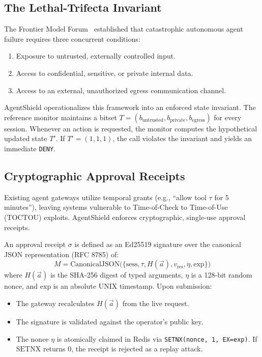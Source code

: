 \documentclass[conference]{IEEEtran}
\begin{document}
\subsection{The Lethal-Trifecta Invariant}
The Frontier Model Forum~\cite{fmf2024} established that catastrophic autonomous agent failure requires three concurrent conditions:
\begin{enumerate}
    \item Exposure to untrusted, externally controlled input.
    \item Access to confidential, sensitive, or private internal data.
    \item Access to an external, unauthorized egress communication channel.
\end{enumerate}
AgentShield operationalizes this framework into an enforced state invariant. The reference monitor maintains a bitset $T = (b_{\text{untrusted}}, b_{\text{private}}, b_{\text{egress}})$ for every session. Whenever an action is requested, the monitor computes the hypothetical updated state $T'$. If $T' = (1, 1, 1)$, the call violates the invariant and yields an immediate \texttt{DENY}.

\subsection{Cryptographic Approval Receipts}
Existing agent gateways utilize temporal grants (e.g., ``allow tool $\tau$ for 5 minutes''), leaving systems vulnerable to Time-of-Check to Time-of-Use (TOCTOU) exploits. AgentShield enforces cryptographic, single-use approval receipts.

An approval receipt $\sigma$ is defined as an Ed25519 signature over the canonical JSON representation (RFC 8785) of:
\begin{equation}
M = \text{CanonicalJSON}\Big( \{ \text{sess}, \tau, H(\vec{a}), v_{\text{res}}, \eta, \text{exp} \} \Big)
\end{equation}
where $H(\vec{a})$ is the SHA-256 digest of typed arguments, $\eta$ is a 128-bit random nonce, and $\text{exp}$ is an absolute UNIX timestamp. Upon submission:
\begin{itemize}
    \item The gateway recalculates $H(\vec{a})$ from the live request.
    \item The signature is validated against the operator's public key.
    \item The nonce $\eta$ is atomically claimed in Redis via \texttt{SETNX(nonce, 1, EX=exp)}. If $\text{SETNX}$ returns 0, the receipt is rejected as a replay attack.
\end{itemize}
\end{document}
